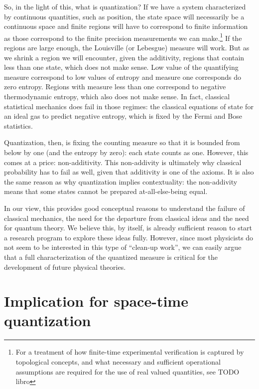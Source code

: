 \documentclass[10pt,twocolumn, nofootinbib]{revtex4-2}
\begin{document}
So, in the light of this, what is quantization? If we have a system characterized by continuous quantities, such as position, the state space will necessarily be a continuous space and finite regions will have to correspond to finite information as those correspond to the finite precision measurements we can make.\footnote{For a treatment of how finite-time experimental verification is captured by topological concepts, and what necessary and sufficient operational assumptions are required for the use of real valued quantities, see TODO libro} If the regions are large enough, the Louisville (or Lebesgue) measure will work. But as we shrink a region we will encounter, given the additivity, regions that contain less than one state, which does not make sense. Low value of the quantifying measure correspond to low values of entropy and measure one corresponds do zero entropy. Regions with measure less than one correspond to negative thermodynamic entropy, which also does not make sense. In fact, classical statistical mechanics does fail in those regimes: the classical equations of state for an ideal gas to predict negative entropy, which is fixed by the Fermi and Bose statistics.

Quantization, then, is fixing the counting measure so that it is bounded from below by one (and the entropy by zero): each state counts as one. However, this comes at a price: non-additivity. This non-addivity is ultimately why classical probability has to fail as well, given that additivity is one of the axioms. It is also the same reason as why quantization implies contextuality: the non-addivity means that some states cannot be prepared at-all-else-being equal.

In our view, this provides good conceptual reasons to understand the failure of classical mechanics, the need for the departure from classical ideas and the need for quantum theory. We believe this, by itself, is already sufficient reason to start a research program to explore these ideas fully. However, since most physicists do not seem to be interested in this type of ``clean-up work'', we can easily argue that a full characterization of the quantized measure is critical for the development of future physical theories.

\section{Implication for space-time quantization}
\end{document}
